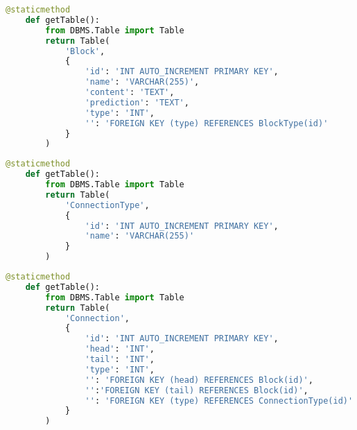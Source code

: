 \begin{lstlisting}[language=Python, caption={$\texttt{getTable}$ function - Block class.}, label={lst:18}]
    @staticmethod
    def getTable():
        from DBMS.Table import Table
        return Table(
            'Block',
            {
                'id': 'INT AUTO_INCREMENT PRIMARY KEY',
                'name': 'VARCHAR(255)',
                'content': 'TEXT',
                'prediction': 'TEXT',
                'type': 'INT',
                '': 'FOREIGN KEY (type) REFERENCES BlockType(id)'
            }
        )
\end{lstlisting}

\begin{lstlisting}[language=Python, caption={$\texttt{getTable}$ function - ConnectionType class.}, label={lst:19}]
    @staticmethod
    def getTable():
        from DBMS.Table import Table
        return Table(
            'ConnectionType',
            {
                'id': 'INT AUTO_INCREMENT PRIMARY KEY',
                'name': 'VARCHAR(255)'
            }
        )
\end{lstlisting}

\begin{lstlisting}[language=Python, caption={$\texttt{getTable}$ function - Connection class.}, label={lst:20}]
    @staticmethod
    def getTable():
        from DBMS.Table import Table
        return Table(
            'Connection',
            {
                'id': 'INT AUTO_INCREMENT PRIMARY KEY',
                'head': 'INT',
                'tail': 'INT',
                'type': 'INT',
                '': 'FOREIGN KEY (head) REFERENCES Block(id)',
                '':'FOREIGN KEY (tail) REFERENCES Block(id)',
                '': 'FOREIGN KEY (type) REFERENCES ConnectionType(id)'
            }
        )
\end{lstlisting}

